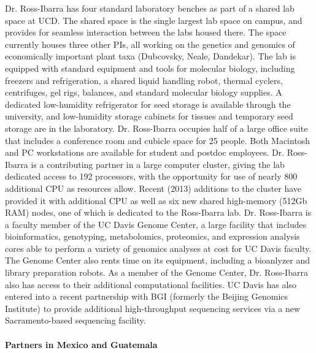 Dr. Ross-Ibarra has four standard laboratory benches as part of a shared lab space at UCD.  The shared space is the single largest lab space on campus, and provides for seamless interaction between the labs housed there.  The space currently houses three other PIs, all working on the genetics and genomics of economically important plant taxa (Dubcovsky, Neale, Dandekar). The lab is equipped with standard equipment and tools for molecular biology, including freezers and refrigeration, a shared liquid handling robot, thermal cyclers, centrifuges, gel rigs, balances, and standard molecular biology supplies.  A dedicated low-humidity refrigerator for seed storage is available through the university, and low-humidity storage cabinets for tissues and temporary seed storage are in the laboratory. Dr. Ross-Ibarra occupies half of a large office suite that includes a conference room and cubicle space for 25 people.  Both Macintosh and PC workstations are available for student and postdoc employees. Dr. Ross-Ibarra is a contributing partner in a large computer cluster, giving the lab dedicated access to 192 processors, with the opportunity for use of nearly 800 additional CPU as resources allow. Recent (2013) additions to the cluster have provided it with additional CPU as well as six new shared high-memory (512Gb RAM) nodes, one of which is dedicated to the Ross-Ibarra lab. Dr. Ross-Ibarra is a faculty member of the UC Davis Genome Center, a large facility that includes bioinformatics, genotyping, metabolomics, proteomics, and expression analysis cores able to perform a variety of genomics analyses at cost for UC Davis faculty. The Genome Center also rents time on its equipment, including a bioanlyzer and library preparation robots. As a member of the Genome Center, Dr. Ross-Ibarra also has access to their additional computational facilities. UC Davis has also entered into a recent partnership with BGI (formerly the Beijing Genomics Institute) to provide additional high-throughput sequencing services via a new Sacramento-based sequencing facility.

\clearpage

\paragraph{\textbf{Partners in Mexico and Guatemala}}\

